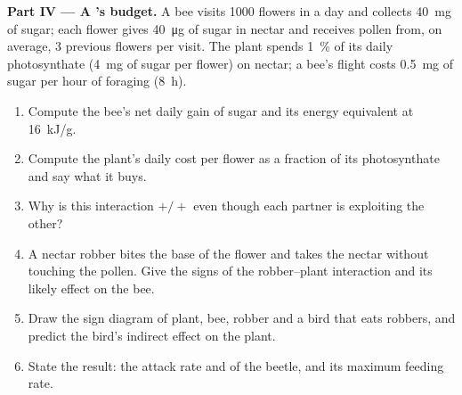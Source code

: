 \begin{problem}
\medskip
\noindent\textbf{Part IV --- A 's budget.}
A bee visits 1000 flowers in a day and collects \qty{40}{mg} of sugar;
each flower gives \qty{40}{\micro g} of sugar in nectar and receives
pollen from, on average, 3 previous flowers per visit. The plant
spends \qty{1}{\%} of its daily photosynthate (\qty{4}{mg} of sugar per
flower) on nectar; a bee's flight costs \qty{0.5}{mg} of sugar per
hour of foraging (\qty{8}{h}).
\begin{enumerate}[resume]
  \item Compute the bee's net daily gain of sugar and its energy
        equivalent at \qty{16}{kJ/g}.
  \item Compute the plant's daily cost per flower as a fraction of its
        photosynthate and say what it buys.
  \item Why is this interaction $+/+$ even though each partner is
        exploiting the other?
  \item A nectar robber bites the base of the flower and takes the
        nectar without touching the pollen. Give the signs of the
        robber--plant interaction and its likely effect on the bee.
  \item Draw the sign diagram of plant, bee, robber and a bird that
        eats robbers, and predict the bird's indirect effect on the
        plant.
  \item State the result: the attack rate and  of the
        beetle, and its maximum feeding rate.
\end{enumerate}
\end{problem}
